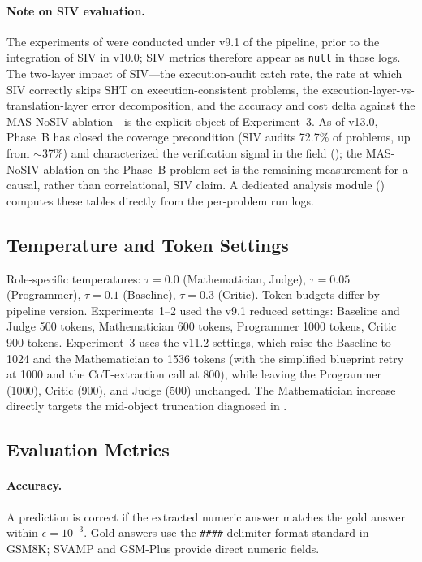 \documentclass[11pt,a4paper]{article}
\begin{document}
\paragraph{Note on SIV evaluation.}
The experiments of  were conducted under v9.1 of the pipeline, prior to the integration of SIV in v10.0; SIV metrics therefore appear as \texttt{null} in those logs.
The two-layer impact of SIV---the execution-audit catch rate, the rate at which SIV correctly skips SHT on execution-consistent problems, the execution-layer-vs-translation-layer error decomposition, and the accuracy and cost delta against the MAS-NoSIV ablation---is the explicit object of Experiment~3.
As of v13.0, Phase~B has closed the coverage precondition (SIV audits 72.7\% of problems, up from $\sim$37\%) and characterized the verification signal in the field (); the MAS-NoSIV ablation on the Phase~B problem set is the remaining measurement for a causal, rather than correlational, SIV claim.
A dedicated analysis module () computes these tables directly from the per-problem run logs.
\subsection{Temperature and Token Settings}
Role-specific temperatures: $\tau=0.0$ (Mathematician, Judge), $\tau=0.05$ (Programmer), $\tau=0.1$ (Baseline), $\tau=0.3$ (Critic).
Token budgets differ by pipeline version. Experiments~1--2 used the v9.1 reduced settings: Baseline and Judge 500 tokens, Mathematician 600 tokens, Programmer 1000 tokens, Critic 900 tokens. Experiment~3 uses the v11.2 settings, which raise the Baseline to 1024 and the Mathematician to 1536 tokens (with the simplified blueprint retry at 1000 and the CoT-extraction call at 800), while leaving the Programmer (1000), Critic (900), and Judge (500) unchanged. The Mathematician increase directly targets the mid-object truncation diagnosed in .
\subsection{Evaluation Metrics}
\paragraph{Accuracy.}
A prediction is correct if the extracted numeric answer matches the gold answer within $\epsilon=10^{-3}$.
Gold answers use the \texttt{\#\#\#\#} delimiter format standard in GSM8K; SVAMP and GSM-Plus provide direct numeric fields.
\end{document}
